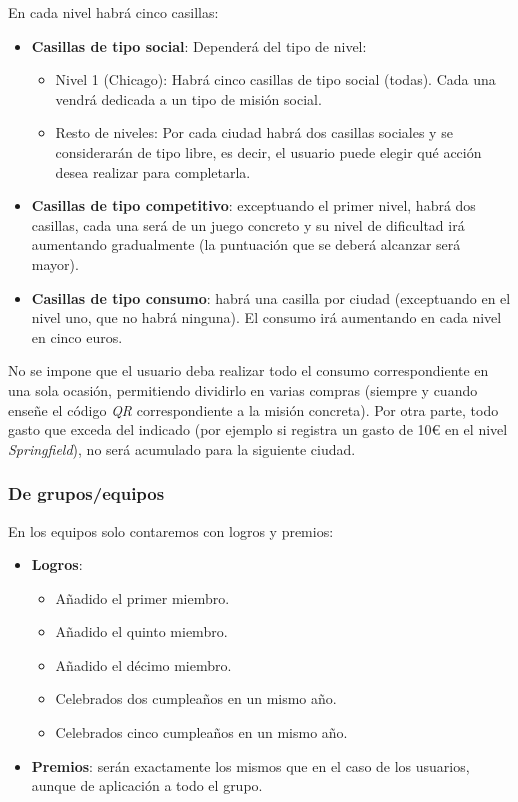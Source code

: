 \documentclass[twoside]{report}
\begin{document}
En cada nivel habrá cinco casillas:
\begin{itemize}
    \item \textbf{Casillas de tipo social}: Dependerá del tipo de nivel:
    \begin{itemize}
        \item Nivel 1 (Chicago): Habrá cinco casillas de tipo social (todas). Cada una vendrá dedicada a un tipo de misión social.
        \item Resto de niveles: Por cada ciudad habrá dos casillas sociales y se considerarán de tipo libre, es decir, el usuario puede elegir qué acción desea realizar para completarla.
    \end{itemize}
    \item \textbf{Casillas de tipo competitivo}: exceptuando el primer nivel, habrá dos casillas, cada una será de un juego concreto y su nivel de dificultad irá aumentando gradualmente (la puntuación que se deberá alcanzar será mayor).
    \item \textbf{Casillas de tipo consumo}: habrá una casilla por ciudad (exceptuando en el nivel uno, que no habrá ninguna). El consumo irá aumentando en cada nivel en cinco euros.
\end{itemize}

No se impone que el usuario deba realizar todo el consumo correspondiente en una sola ocasión, permitiendo dividirlo en varias compras (siempre y cuando enseñe el código \textit{QR} correspondiente a la misión concreta). Por otra parte, todo gasto que exceda del indicado (por ejemplo si registra un gasto de 10\euro \vspace{0.1cm} en el nivel \textit{Springfield}), no será acumulado para la siguiente ciudad.

\subsubsection{De grupos/equipos}

En los equipos solo contaremos con logros y premios:
\begin{itemize}
	\item \textbf{Logros}:
		\begin{itemize}
		\item Añadido el primer miembro.
		\item Añadido el quinto miembro.
		\item Añadido el décimo miembro.
		\item Celebrados dos cumpleaños en un mismo año.
		\item Celebrados cinco cumpleaños en un mismo año.
		\end{itemize}
	\item \textbf{Premios}: serán exactamente los mismos que en el caso de los usuarios, aunque de aplicación a todo el grupo.
\end{itemize}
\end{document}
